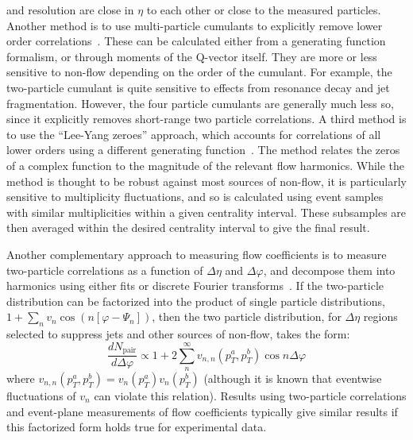 and resolution are close in $\eta$ to each other or close to the measured particles.
%
Another method is to use multi-particle cumulants to explicitly remove lower order
correlations~\cite{Borghini:2000sa,Borghini:2001vi,Borghini:2001zr,Bilandzic:2010jr}.
These can be calculated either from a generating function formalism, or through moments of the Q-vector itself.
They are more or less sensitive to non-flow depending on the order of the cumulant.  For example, the two-particle
cumulant is quite sensitive to effects from resonance decay and jet fragmentation.  However, the four particle
cumulants are generally much less so, since it explicitly removes short-range two particle correlations.
%
A third method is to use the ``Lee-Yang zeroes'' approach, which accounts for correlations of all lower orders using a
different generating function~\cite{Bhalerao:2003yq,Borghini:2004ke}.
The method relates the zeros of a complex function to the magnitude of the relevant
flow harmonics.  While the method is thought to be robust against most sources of non-flow, it is particularly sensitive to
multiplicity fluctuations, and so is calculated using event samples with similar multiplicities within a given
centrality interval.  These subsamples are then averaged within the desired centrality interval to give the final result.

Another complementary approach to measuring flow coefficients is to
measure two-particle correlations as a function of $\Delta\eta$ and
$\Delta\varphi$, and decompose them into harmonics using either fits
or discrete Fourier
transforms~\cite{ATLAS:2012at,Aamodt:2011by,ALICE:2011ab}.  If
the two-particle distribution can be factorized into the product of
single particle distributions, $1+\sum_n v_n \cos(n[\varphi-\Psi_n])$,
then the two particle distribution, for $\Delta\eta$ regions selected
to suppress jets and other sources of non-flow, takes the form:
\begin{equation}
\frac{dN_{\mathrm{pair}}}{d\Delta\varphi} \propto 1 + 2 \sum_n^{\infty} v_{n,n}(p_T^a,p_T^b) \cos n\Delta\varphi
\end{equation}
where $v_{n,n}(p_T^a,p_T^b) = v_n(p_T^a) v_n(p_T^b)$ (although it is known that
eventwise fluctuations of $v_n$ can violate this relation).  Results using
two-particle correlations and event-plane measurements of flow coefficients
typically give similar results if this factorized form holds true for
experimental data.


